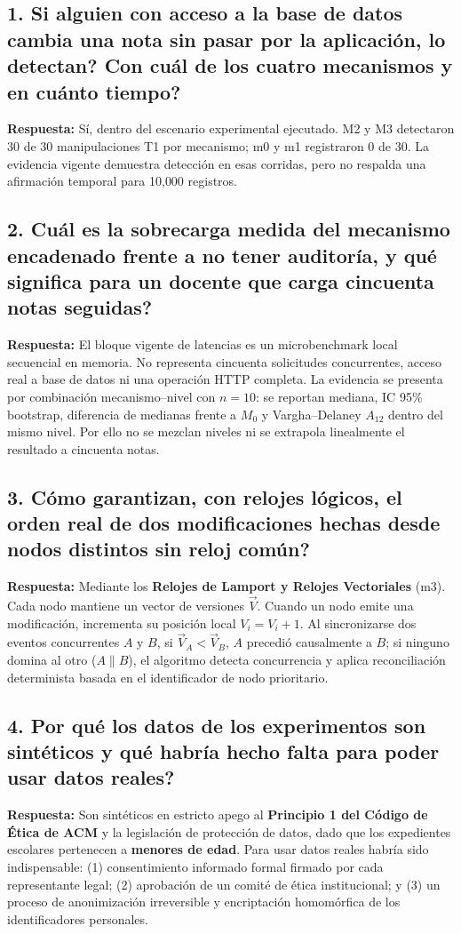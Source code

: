 \documentclass[11pt,a4paper]{article}
\begin{document}
\subsection*{1. \textquestiondown Si alguien con acceso a la base de datos cambia una nota sin pasar por la aplicaci\'on, \textquestiondown lo detectan? \textquestiondown Con cu\'al de los cuatro mecanismos y en cu\'anto tiempo?}
\textbf{Respuesta:} S\'i, dentro del escenario experimental ejecutado. M2 y M3 detectaron 30 de 30 manipulaciones T1 por mecanismo; m0 y m1 registraron 0 de 30. La evidencia vigente demuestra detecci\'on en esas corridas, pero no respalda una afirmaci\'on temporal para 10{,}000 registros.

\subsection*{2. \textquestiondown Cu\'al es la sobrecarga medida del mecanismo encadenado frente a no tener auditor\'ia, y qu\'e significa para un docente que carga cincuenta notas seguidas?}
\textbf{Respuesta:} El bloque vigente de latencias es un microbenchmark local secuencial en memoria. No representa cincuenta solicitudes concurrentes, acceso real a base de datos ni una operaci\'on HTTP completa. La evidencia se presenta por combinaci\'on mecanismo--nivel con $n=10$: se reportan mediana, IC 95\% bootstrap, diferencia de medianas frente a $M_0$ y Vargha--Delaney $A_{12}$ dentro del mismo nivel. Por ello no se mezclan niveles ni se extrapola linealmente el resultado a cincuenta notas.

\subsection*{3. \textquestiondown C\'omo garantizan, con relojes l\'ogicos, el orden real de dos modificaciones hechas desde nodos distintos sin reloj com\'un?}
\textbf{Respuesta:} Mediante los \textbf{Relojes de Lamport y Relojes Vectoriales} (m3). Cada nodo mantiene un vector de versiones $\vec{V}$. Cuando un nodo emite una modificaci\'on, incrementa su posici\'on local $V_i = V_i + 1$. Al sincronizarse dos eventos concurrentes $A$ y $B$, si $\vec{V}_A < \vec{V}_B$, $A$ precedi\'o causalmente a $B$; si ninguno domina al otro ($A \parallel B$), el algoritmo detecta concurrencia y aplica reconciliaci\'on determinista basada en el identificador de nodo prioritario.

\subsection*{4. \textquestiondown Por qu\'e los datos de los experimentos son sint\'eticos y qu\'e habr\'ia hecho falta para poder usar datos reales?}
\textbf{Respuesta:} Son sint\'eticos en estricto apego al \textbf{Principio 1 del C\'odigo de \'Etica de ACM} y la legislaci\'on de protecci\'on de datos, dado que los expedientes escolares pertenecen a \textbf{menores de edad}. Para usar datos reales habr\'ia sido indispensable: (1) consentimiento informado formal firmado por cada representante legal; (2) aprobaci\'on de un comit\'e de \'etica institucional; y (3) un proceso de anonimizaci\'on irreversible y encriptaci\'on homom\'orfica de los identificadores personales.
\end{document}

